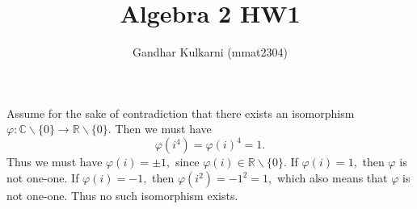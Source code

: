 \documentclass{article}
\title{Algebra 2 HW1} %
\author{Gandhar Kulkarni (mmat2304)} %
\date{} %
\begin{document}
\maketitle %


\section{} %
Assume for the sake of contradiction that there exists an isomorphism $\varphi: \mathbb{C}\backslash \{0\} \rightarrow \mathbb{R}\backslash \{0\}.$ Then we 
must have $$\varphi(i^4)=\varphi(i)^4=1.$$ Thus we must have $\varphi(i)=\pm 1,$ since $\varphi(i) \in \mathbb{R}\backslash \{0\}.$ If $\varphi(i)=1,$ then 
$\varphi$ is not one-one. If $\varphi(i)=-1,$ then $\varphi(i^2)=-1^2=1,$ which also means that $\varphi$ is not one-one. Thus no such isomorphism exists.
\end{document}
